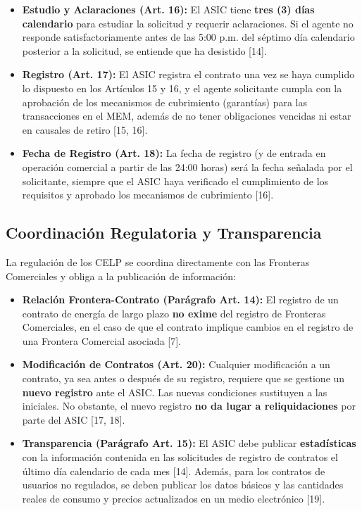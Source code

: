 \documentclass[a5paper]{book}%
\begin{document}
\begin{itemize}
	\item \textbf{Estudio y Aclaraciones (Art. 16):} El ASIC tiene \textbf{tres (3) días calendario} para estudiar la solicitud y requerir aclaraciones. Si el agente no responde satisfactoriamente antes de las 5:00 p.m. del séptimo día calendario posterior a la solicitud, se entiende que ha desistido [14].
	\item \textbf{Registro (Art. 17):} El ASIC registra el contrato una vez se haya cumplido lo dispuesto en los Artículos 15 y 16, y el agente solicitante cumpla con la aprobación de los mecanismos de cubrimiento (garantías) para las transacciones en el MEM, además de no tener obligaciones vencidas ni estar en causales de retiro [15, 16].
	\item \textbf{Fecha de Registro (Art. 18):} La fecha de registro (y de entrada en operación comercial a partir de las 24:00 horas) será la fecha señalada por el solicitante, siempre que el ASIC haya verificado el cumplimiento de los requisitos y aprobado los mecanismos de cubrimiento [16].
\end{itemize}

\subsection{Coordinación Regulatoria y Transparencia}

La regulación de los CELP se coordina directamente con las Fronteras Comerciales y obliga a la publicación de información:

\begin{itemize}
	\item \textbf{Relación Frontera-Contrato (Parágrafo Art. 14):} El registro de un contrato de energía de largo plazo \textbf{no exime} del registro de Fronteras Comerciales, en el caso de que el contrato implique cambios en el registro de una Frontera Comercial asociada [7].
	\item \textbf{Modificación de Contratos (Art. 20):} Cualquier modificación a un contrato, ya sea antes o después de su registro, requiere que se gestione un \textbf{nuevo registro} ante el ASIC. Las nuevas condiciones sustituyen a las iniciales. No obstante, el nuevo registro \textbf{no da lugar a reliquidaciones} por parte del ASIC [17, 18].
	\item \textbf{Transparencia (Parágrafo Art. 15):} El ASIC debe publicar \textbf{estadísticas} con la información contenida en las solicitudes de registro de contratos el último día calendario de cada mes [14]. Además, para los contratos de usuarios no regulados, se deben publicar los datos básicos y las cantidades reales de consumo y precios actualizados en un medio electrónico [19].
\end{itemize}
\end{document}
